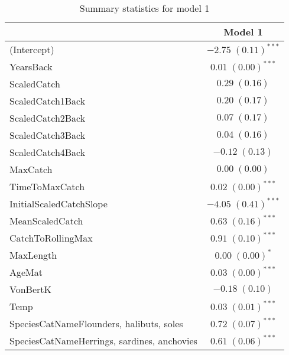 \documentclass[]{article}
\title{}
\author{}
\date{}
\begin{document}
\maketitle



\begin{table}[h]
\caption{Summary statistics for model 1}
\begin{center}
\begin{tabular}{l c }
\hline
                                            & Model 1 \\
\hline
(Intercept)                                 & $-2.75 \; (0.11)^{***}$ \\
YearsBack                                   & $0.01 \; (0.00)^{***}$  \\
ScaledCatch                                 & $0.29 \; (0.16)$        \\
ScaledCatch1Back                            & $0.20 \; (0.17)$        \\
ScaledCatch2Back                            & $0.07 \; (0.17)$        \\
ScaledCatch3Back                            & $0.04 \; (0.16)$        \\
ScaledCatch4Back                            & $-0.12 \; (0.13)$       \\
MaxCatch                                    & $0.00 \; (0.00)$        \\
TimeToMaxCatch                              & $0.02 \; (0.00)^{***}$  \\
InitialScaledCatchSlope                     & $-4.05 \; (0.41)^{***}$ \\
MeanScaledCatch                             & $0.63 \; (0.16)^{***}$  \\
CatchToRollingMax                           & $0.91 \; (0.10)^{***}$  \\
MaxLength                                   & $0.00 \; (0.00)^{*}$    \\
AgeMat                                      & $0.03 \; (0.00)^{***}$  \\
VonBertK                                    & $-0.18 \; (0.10)$       \\
Temp                                        & $0.03 \; (0.01)^{***}$  \\
SpeciesCatNameFlounders, halibuts, soles    & $0.72 \; (0.07)^{***}$  \\
SpeciesCatNameHerrings, sardines, anchovies & $0.61 \; (0.06)^{***}$  \\

\end{tabular}
\end{center}
\end{table}
\end{document}
